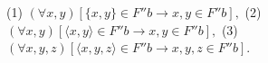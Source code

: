 (1) $(\forall x, y)[\{x, y\} \in F''b \rightarrow x, y \in F''b],$
(2) $(\forall x, y)[\langle x, y \rangle \in F''b \rightarrow x, y \in F''b],$
(3) $(\forall x, y, z)[\langle x, y, z \rangle \in F''b \rightarrow x, y, z \in F''b].$
